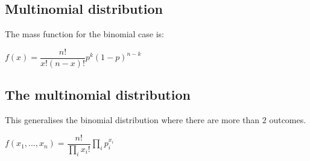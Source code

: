 
\subsection{Multinomial distribution}

The mass function for the binomial case is:

\(f(x)=\dfrac{n!}{x!(n-x)!}p^k(1-p)^{n-k}\)

\subsection{The multinomial distribution}

This generalises the binomial distribution where there are more than \(2\) outcomes.

\(f(x_1,...,x_n)=\dfrac{n!}{\prod_i x_i!}\prod_i p_i^{x_i}\)


